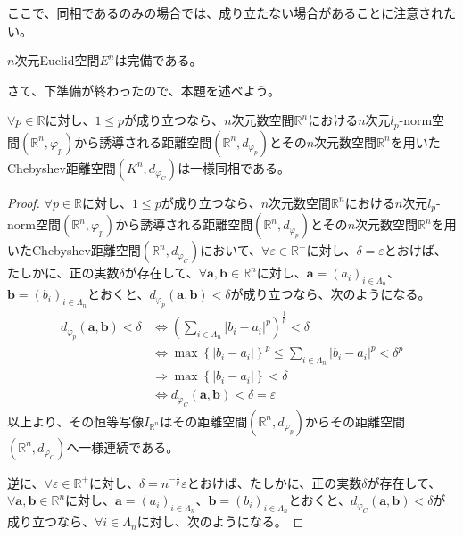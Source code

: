 \documentclass[dvipdfmx]{jsarticle}
\begin{document}
ここで、同相であるのみの場合では、成り立たない場合があることに注意されたい。
\begin{thm}\label{8.2.5.9}
$n$次元Euclid空間$E^{n}$は完備である。
\end{thm}\par
さて、下準備が終わったので、本題を述べよう。
\begin{thm}\label{2.3.2.9}
$\forall p \in \mathbb{R}$に対し、$1 \leq p$が成り立つなら、$n$次元数空間$\mathbb{R}^{n}$における$n$次元$l_{p}$-norm空間$\left( \mathbb{R}^{n},\varphi_{p} \right)$から誘導される距離空間$\left( \mathbb{R}^{n},d_{\varphi_{p}} \right)$とその$n$次元数空間$\mathbb{R}^{n}$を用いたChebyshev距離空間$\left( K^{n},d_{\varphi_{C}} \right)$は一様同相である。
\end{thm}
\begin{proof}
$\forall p \in \mathbb{R}$に対し、$1 \leq p$が成り立つなら、$n$次元数空間$\mathbb{R}^{n}$における$n$次元$l_{p}$-norm空間$\left( \mathbb{R}^{n},\varphi_{p} \right)$から誘導される距離空間$\left( \mathbb{R}^{n},d_{\varphi_{p}} \right)$とその$n$次元数空間$\mathbb{R}^{n}$を用いたChebyshev距離空間$\left( \mathbb{R}^{n},d_{\varphi_{C}} \right)$において、$\forall\varepsilon \in \mathbb{R}^{+}$に対し、$\delta = \varepsilon$とおけば、たしかに、正の実数$\delta$が存在して、$\forall\mathbf{a},\mathbf{b} \in \mathbb{R}^{n}$に対し、$\mathbf{a} = \left( a_{i} \right)_{i \in \varLambda_{n}}$、$\mathbf{b} = \left( b_{i} \right)_{i \in \varLambda_{n}}$とおくと、$d_{\varphi_{p}}\left( \mathbf{a},\mathbf{b} \right) < \delta$が成り立つなら、次のようになる。
\begin{align*}
d_{\varphi_{p}}\left( \mathbf{a},\mathbf{b} \right) < \delta &\Leftrightarrow \left( \sum_{i \in \varLambda_{n}} \left| b_{i} - a_{i} \right|^{p} \right)^{\frac{1}{p}} < \delta\\
&\Leftrightarrow {\max\left\{ \left| b_{i} - a_{i} \right| \right\}}^{p} \leq \sum_{i \in \varLambda_{n}} \left| b_{i} - a_{i} \right|^{p} < \delta^{p}\\
&\Rightarrow \max\left\{ \left| b_{i} - a_{i} \right| \right\} < \delta\\
&\Leftrightarrow d_{\varphi_{C}}\left( \mathbf{a},\mathbf{b} \right) < \delta = \varepsilon
\end{align*}
以上より、その恒等写像$I_{\mathbb{R}^{n}}$はその距離空間$\left( \mathbb{R}^{n},d_{\varphi_{p}} \right)$からその距離空間$\left( \mathbb{R}^{n},d_{\varphi_{C}} \right)$へ一様連続である。\par
逆に、$\forall\varepsilon \in \mathbb{R}^{+}$に対し、$\delta = n^{- \frac{1}{p}}\varepsilon$とおけば、たしかに、正の実数$\delta$が存在して、$\forall\mathbf{a},\mathbf{b} \in \mathbb{R}^{n}$に対し、$\mathbf{a} = \left( a_{i} \right)_{i \in \varLambda_{n}}$、$\mathbf{b} = \left( b_{i} \right)_{i \in \varLambda_{n}}$とおくと、$d_{\varphi_{C}}\left( \mathbf{a},\mathbf{b} \right) < \delta$が成り立つなら、$\forall i \in \varLambda_{n}$に対し、次のようになる。

\end{proof}
\end{document}
